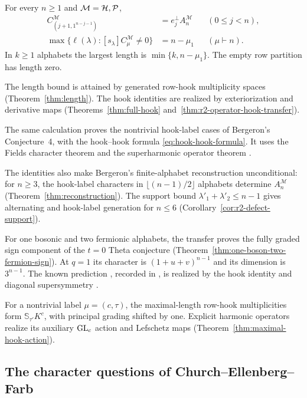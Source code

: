 \begin{maintheorem}
\label{thm:intro-hooks}
For every $n\ge1$ and $\mathcal M=\mathcal H,\mathcal P$,
\begin{align*}
 C_{(j+1,1^{n-j-1})}^{\mathcal M}
          &=e_j^\perp A_n^{\mathcal M} &&(0\le j<n),\\
 \max\{\ell(\lambda):[s_\lambda]C_\mu^{\mathcal M}\ne0\}
          &=n-\mu_1 &&(\mu\vdash n).
\end{align*}
In $k\ge1$ alphabets the largest length is
$\min\{k,n-\mu_1\}$.  The empty row partition has length zero.
\end{maintheorem}

The length bound is attained by generated row-hook multiplicity
spaces (Theorem~\ref{thm:length}). The hook identities are realized
by exteriorization and derivative maps
(Theorems~\ref{thm:full-hook} and~\ref{thm:r2-operator-hook-transfer}).

The same calculation proves the nontrivial hook-label cases of
Bergeron's Conjecture~4, with the hook--hook formula
\eqref{eq:hook-hook-formula}. It uses the Fields character theorem
\cite{MRW} and the superharmonic operator theorem \cite{RW}.

The identities also make Bergeron's finite-alphabet reconstruction
unconditional: for $n\ge3$, the hook-label characters in
$\lfloor(n-1)/2\rfloor$ alphabets determine $A_n^{\mathcal M}$
(Theorem~\ref{thm:reconstruction}). The support bound
$\lambda'_1+\lambda'_2\le n-1$ gives alternating and hook-label
generation for $n\le6$ (Corollary~\ref{cor:r2-defect-support}).

For one bosonic and two fermionic alphabets, the transfer proves
the fully graded sign component of the $t=0$ Theta conjecture
\cite[Conjecture~8.2]{DIV2021}
(Theorem~\ref{thm:one-boson-two-fermion-sign}). At $q=1$ its character
is $(1+u+v)^{n-1}$ and its dimension is $3^{n-1}$.
The known prediction \cite[Theorem~5.6]{INV2024},
recorded in \cite[Theorem~8.3]{Lentfer12}, is realized by the hook
identity and diagonal supersymmetry \cite{Lentfer}.

For a nontrivial label $\mu=(c,\tau)$, the maximal-length row-hook
multiplicities form $\mathbb S_{\tau'}K^c$, with principal grading
shifted by one. Explicit harmonic operators realize its auxiliary
$\operatorname{GL}_c$ action and Lefschetz maps
(Theorem~\ref{thm:maximal-hook-action}).

\subsection{The character questions of Church--Ellenberg--Farb}

